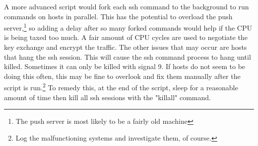 A more advanced script would fork each ssh command to the background to run commands on hosts in parallel.  This has the potential to overload the push server,\footnote{The push server is most likely to be a fairly old machine} so adding a delay after so many forked commands would help if the CPU is being taxed too much.  A fair amount of CPU cycles are used to negotiate the key exchange and encrypt the traffic.  The other issues that may occur are hosts that hang the ssh session.  This will cause the ssh command process to hang until killed.  Sometimes it can only be killed with signal 9.  If hosts do not seem to be doing this often, this may be fine to overlook and fix them manually after the script is run.\footnote{Log the malfunctioning systems and investigate them, of course.}  To remedy this, at the end of the script, sleep for a reasonable amount of time then kill all ssh sessions with the "killall" command.  

